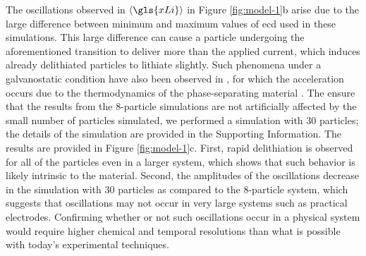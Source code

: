 \documentclass{article}
\begin{document}
The oscillations observed in $\left\langle \gls{xLi} \right\rangle$ in
Figure \ref{fig:model-1}b arise due to the large difference between
minimum and maximum values of \gls{ecd} used in these
simulations. This large difference can cause a particle undergoing the
aforementioned transition to deliver more than the applied current,
which induces already delithiated particles to lithiate slightly. Such
phenomena under a galvanostatic condition have also been observed in
, for which the acceleration occurs due to the
thermodynamics of the phase-separating material
\cite{thornton2015}. The ensure that the results from the 8-particle simulations
are not artificially affected by the small number of particles
simulated, we performed a simulation with 30 particles; the details of
the simulation are provided in the Supporting Information. The results
are provided in Figure \ref{fig:model-1}c. First, rapid delithiation
is observed for all of the particles even in a larger system, which
shows that such behavior is likely intrinsic to the material. Second,
the amplitudes of the oscillations decrease in the simulation with 30
particles as compared to the 8-particle system, which suggests that
oscillations may not occur in very large systems such as practical
electrodes.  Confirming whether or not such oscillations occur in a
physical system would require higher chemical and temporal resolutions
than what is possible with today's experimental techniques.
\end{document}
